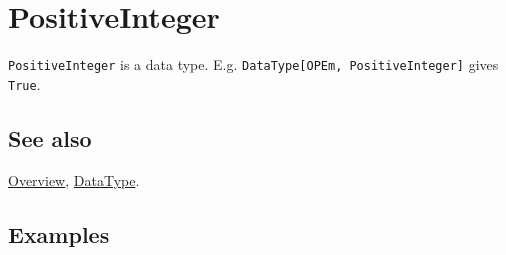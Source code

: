 \documentclass[../FeynCalcManual.tex]{subfiles}
\begin{document}
\hypertarget{positiveinteger}{
\section{PositiveInteger}\label{positiveinteger}}

\texttt{PositiveInteger} is a data type. E.g.
\texttt{DataType[\allowbreak{}OPEm,\ \allowbreak{}PositiveInteger]}
gives \texttt{True}.

\subsection{See also}

\hyperlink{toc}{Overview}, \hyperlink{datatype}{DataType}.

\subsection{Examples}
\end{document}
